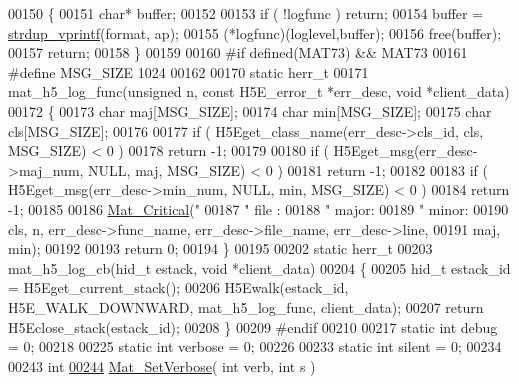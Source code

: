 \begin{DoxyCode}
{{{{{{{{{{00150 \{
00151     \textcolor{keywordtype}{char}* buffer;
00152 
00153     \textcolor{keywordflow}{if} ( !logfunc ) \textcolor{keywordflow}{return};
00154     buffer = \hyperlink{group__mat__util_ga2b342987d3b664345cb233640b611fe9}{strdup\_vprintf}(format, ap);
00155     (*logfunc)(loglevel,buffer);
00156     free(buffer);
00157     \textcolor{keywordflow}{return};
00158 \}
00159 
00160 \textcolor{preprocessor}{#if defined(MAT73) && MAT73}
00161 \textcolor{preprocessor}{#define MSG\_SIZE 1024}
00162 
00170 \textcolor{keyword}{static} herr\_t
00171 mat\_h5\_log\_func(\textcolor{keywordtype}{unsigned} n, \textcolor{keyword}{const} H5E\_error\_t *err\_desc, \textcolor{keywordtype}{void} *client\_data)
00172 \{
00173     \textcolor{keywordtype}{char} maj[MSG\_SIZE];
00174     \textcolor{keywordtype}{char} min[MSG\_SIZE];
00175     \textcolor{keywordtype}{char} cls[MSG\_SIZE];
00176 
00177     \textcolor{keywordflow}{if} ( H5Eget\_class\_name(err\_desc->cls\_id, cls, MSG\_SIZE) < 0 )
00178         \textcolor{keywordflow}{return} -1;
00179 
00180     \textcolor{keywordflow}{if} ( H5Eget\_msg(err\_desc->maj\_num, NULL, maj, MSG\_SIZE) < 0 )
00181         \textcolor{keywordflow}{return} -1;
00182 
00183     \textcolor{keywordflow}{if} ( H5Eget\_msg(err\_desc->min\_num, NULL, min, MSG\_SIZE) < 0 )
00184         \textcolor{keywordflow}{return} -1;
00185 
00186     \hyperlink{group__mat__util_gaf51f2bfbb5580f575e4dd79757e2b80c}{Mat\_Critical}(\textcolor{stringliteral}{"%
00187         \textcolor{stringliteral}{"      file : %
00188         \textcolor{stringliteral}{"      major: %
00189         \textcolor{stringliteral}{"      minor: %
00190         cls, n, err\_desc->func\_name, err\_desc->file\_name, err\_desc->line,
00191         maj, min);
00192 
00193    \textcolor{keywordflow}{return} 0;
00194 \}
00195 
00202 \textcolor{keyword}{static} herr\_t
00203 mat\_h5\_log\_cb(hid\_t estack, \textcolor{keywordtype}{void} *client\_data)
00204 \{
00205     hid\_t estack\_id = H5Eget\_current\_stack();
00206     H5Ewalk(estack\_id, H5E\_WALK\_DOWNWARD, mat\_h5\_log\_func, client\_data);
00207     \textcolor{keywordflow}{return} H5Eclose\_stack(estack\_id);
00208 \}
00209 \textcolor{preprocessor}{#endif}
00210 
00217 \textcolor{keyword}{static} \textcolor{keywordtype}{int} debug = 0;
00218 
00225 \textcolor{keyword}{static} \textcolor{keywordtype}{int} verbose = 0;
00226 
00233 \textcolor{keyword}{static} \textcolor{keywordtype}{int} silent = 0;
00234 
00243 \textcolor{keywordtype}{int}
\hyperlink{group__mat__util_gaf348b811ee26bfc923924878cea3c9ba}{00244} \hyperlink{group__mat__util_gaf348b811ee26bfc923924878cea3c9ba}{Mat\_SetVerbose}( \textcolor{keywordtype}{int} verb, \textcolor{keywordtype}{int} s )
}}}}}}}}}}}}}}
\end{DoxyCode}
